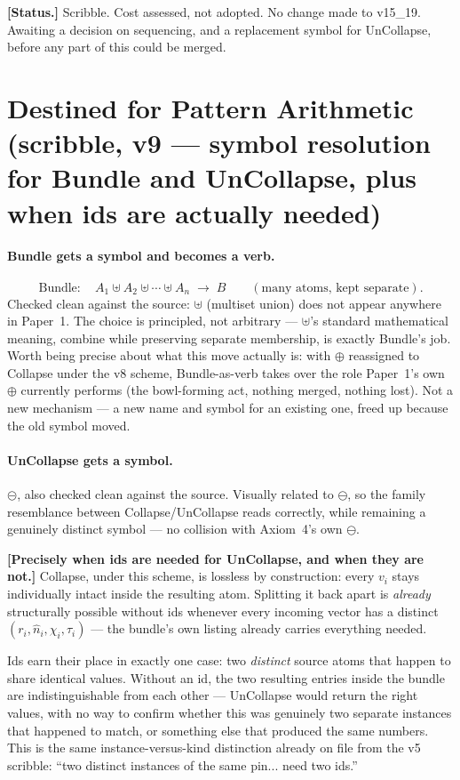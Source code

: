 \documentclass[11pt]{article}
\begin{document}
\textbf{[Status.]} Scribble. Cost assessed, not adopted. No change
made to v15\_19. Awaiting a decision on sequencing, and a replacement
symbol for UnCollapse, before any part of this could be merged.

\section{Destined for Pattern Arithmetic (scribble, v9 --- symbol
resolution for Bundle and UnCollapse, plus when ids are actually
needed)}

\paragraph{Bundle gets a symbol and becomes a verb.}
\[
\text{Bundle}:\quad A_1 \uplus A_2 \uplus \cdots \uplus A_n
\;\longrightarrow\; B \qquad (\text{many atoms, kept separate}).
\]
Checked clean against the source: $\uplus$ (multiset union) does not
appear anywhere in Paper~1. The choice is principled, not arbitrary
--- $\uplus$'s standard mathematical meaning, combine while
preserving separate membership, is exactly Bundle's job. Worth being
precise about what this move actually is: with $\oplus$ reassigned to
Collapse under the v8 scheme, Bundle-as-verb takes over the role
Paper~1's own $\oplus$ currently performs (the bowl-forming act,
nothing merged, nothing lost). Not a new mechanism --- a new name and
symbol for an existing one, freed up because the old symbol moved.

\paragraph{UnCollapse gets a symbol.} $\circleddash$, also checked
clean against the source. Visually related to $\ominus$, so the
family resemblance between Collapse/UnCollapse reads correctly, while
remaining a genuinely distinct symbol --- no collision with Axiom~4's
own $\ominus$.

\textbf{[Precisely when ids are needed for UnCollapse, and when they
are not.]} Collapse, under this scheme, is lossless by construction:
every $v_i$ stays individually intact inside the resulting atom.
Splitting it back apart is \emph{already} structurally possible
without ids whenever every incoming vector has a distinct
$(r_i,\hat n_i,\chi_i,\tau_i)$ --- the bundle's own listing already
carries everything needed.

Ids earn their place in exactly one case: two \emph{distinct} source
atoms that happen to share identical values. Without an id, the two
resulting entries inside the bundle are indistinguishable from each
other --- UnCollapse would return the right values, with no way to
confirm whether this was genuinely two separate instances that
happened to match, or something else that produced the same numbers.
This is the same instance-versus-kind distinction already on file
from the v5 scribble: ``two distinct instances of the same pin...
need two ids.''
\end{document}
